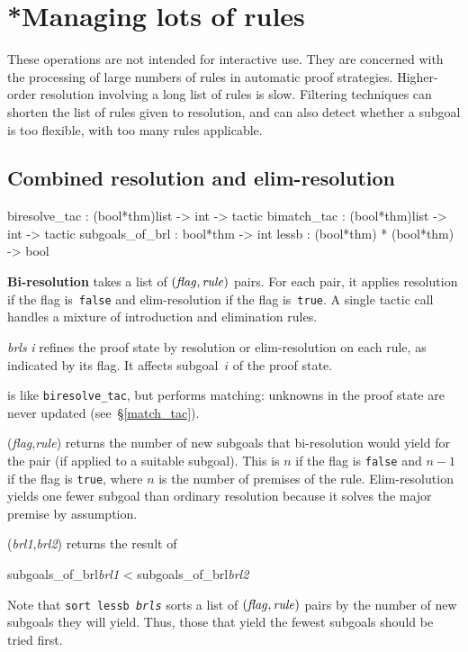 \section{*Managing lots of rules}
These operations are not intended for interactive use.  They are concerned
with the processing of large numbers of rules in automatic proof
strategies.  Higher-order resolution involving a long list of rules is
slow.  Filtering techniques can shorten the list of rules given to
resolution, and can also detect whether a subgoal is too flexible,
with too many rules applicable.

\subsection{Combined resolution and elim-resolution} \label{biresolve_tac}
\begin{ttbox} 
biresolve_tac   : (bool*thm)list -> int -> tactic
bimatch_tac     : (bool*thm)list -> int -> tactic
subgoals_of_brl : bool*thm -> int
lessb           : (bool*thm) * (bool*thm) -> bool
\end{ttbox}
{\bf Bi-resolution} takes a list of $\it (flag,rule)$ pairs.  For each
pair, it applies resolution if the flag is~{\tt false} and
elim-resolution if the flag is~{\tt true}.  A single tactic call handles a
mixture of introduction and elimination rules.

\begin{ttdescription}
\item[\ttindexbold{biresolve_tac} {\it brls} {\it i}] 
refines the proof state by resolution or elim-resolution on each rule, as
indicated by its flag.  It affects subgoal~$i$ of the proof state.

\item[\ttindexbold{bimatch_tac}] 
is like {\tt biresolve_tac}, but performs matching: unknowns in the
proof state are never updated (see~\S\ref{match_tac}).

\item[\ttindexbold{subgoals_of_brl}({\it flag},{\it rule})] 
returns the number of new subgoals that bi-res\-o\-lu\-tion would yield for the
pair (if applied to a suitable subgoal).  This is $n$ if the flag is
{\tt false} and $n-1$ if the flag is {\tt true}, where $n$ is the number
of premises of the rule.  Elim-resolution yields one fewer subgoal than
ordinary resolution because it solves the major premise by assumption.

\item[\ttindexbold{lessb} ({\it brl1},{\it brl2})] 
returns the result of 
\begin{ttbox}
subgoals_of_brl{\it brl1} < subgoals_of_brl{\it brl2}
\end{ttbox}
\end{ttdescription}
Note that \hbox{\tt sort lessb {\it brls}} sorts a list of $\it
(flag,rule)$ pairs by the number of new subgoals they will yield.  Thus,
those that yield the fewest subgoals should be tried first.


